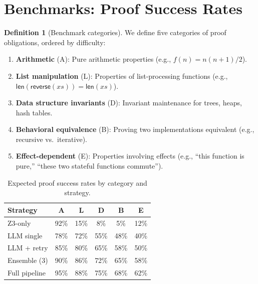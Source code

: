 \documentclass[11pt,a4paper]{report}
\theoremstyle{definition}
\newtheorem{definition}{Definition}[chapter]
\theoremstyle{plain}
\begin{document}
\section{Benchmarks: Proof Success Rates}

\begin{definition}[Benchmark categories]
We define five categories of proof obligations, ordered by difficulty:
\begin{enumerate}
  \item \textbf{Arithmetic} (A): Pure arithmetic properties (e.g., $f(n) = n(n+1)/2$).
  \item \textbf{List manipulation} (L): Properties of list-processing functions
    (e.g., $\mathsf{len}(\mathsf{reverse}(xs)) = \mathsf{len}(xs)$).
  \item \textbf{Data structure invariants} (D): Invariant maintenance for trees,
    heaps, hash tables.
  \item \textbf{Behavioral equivalence} (B): Proving two implementations
    equivalent (e.g., recursive vs.\ iterative).
  \item \textbf{Effect-dependent} (E): Properties involving effects (e.g.,
    ``this function is pure,'' ``these two stateful functions commute'').
\end{enumerate}
\end{definition}

\begin{table}[ht]
\centering
\caption{Expected proof success rates by category and strategy.}
\label{tab:benchmarks}
\begin{tabular}{lccccc}
\toprule
\textbf{Strategy} & \textbf{A} & \textbf{L} & \textbf{D} & \textbf{B} & \textbf{E} \\
\midrule
Z3-only         & 92\% & 15\% &  8\% &  5\% & 12\% \\
LLM single      & 78\% & 72\% & 55\% & 48\% & 40\% \\
LLM + retry     & 85\% & 80\% & 65\% & 58\% & 50\% \\
Ensemble (3)     & 90\% & 86\% & 72\% & 65\% & 58\% \\
Full pipeline    & 95\% & 88\% & 75\% & 68\% & 62\% \\
\bottomrule
\end{tabular}
\end{table}
\end{document}

